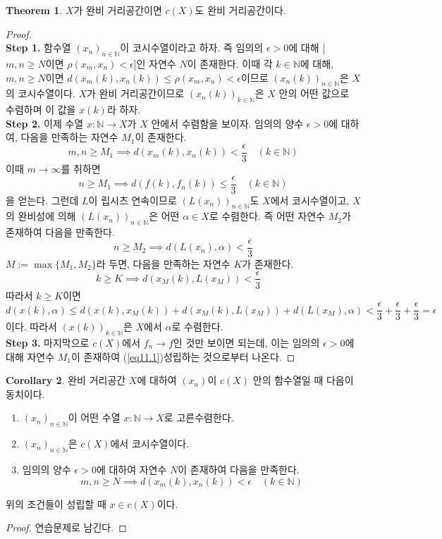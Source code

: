\documentclass[11pt]{book}
\numberwithin{equation}{chapter}
\def\NN{\mathbb{N}}
\def\eps{\epsilon}
\theoremstyle{definition}
\newtheorem{thm}{Theorem}[section]
\newtheorem{cor}[thm]{Corollary}
\newenvironment{enum}
	{\begin{enumerate}[label=(\alph*), leftmargin=2\parindent]}
	{\end{enumerate}}
\begin{document}
\begin{thm}
    \(X\)가 완비 거리공간이면 \(c(X)\)도 완비 거리공간이다.
\end{thm}
\begin{proof}
    \quad\\
    \textbf{Step 1.} 함수열 \((x_n)_{n \in \NN}\)이 코시수열이라고 하자. 즉 임의의 \(\eps > 0\)에 대해 [\(m, n \ge N\)이면 \(\rho(x_m, x_n) < \eps\)]인 자연수 \(N\)이 존재한다. 이때 각 \(k \in \NN\)에 대해, \(m, n \ge N\)이면 \(d(x_m(k), x_n(k)) \le \rho(x_m, x_n) < \eps\)이므로 \((x_n(k))_{n \in \NN}\)은 \(X\)의 코시수열이다. \(X\)가 완비 거리공간이므로 \((x_n(k))_{k \in \NN}\)은 \(X\) 안의 어떤 값으로 수렴하며 이 값을 \(x(k)\)라 하자.\\
    \textbf{Step 2.} 이제 수열 \(x : \NN \to X\)가 \(X\) 안에서 수렴함을 보이자. 임의의 양수 \(\eps > 0\)에 대하여, 다음을 만족하는 자연수 \(M_1\)이 존재한다.
    \[
        m, n \ge M_1 \implies d(x_m(k), x_n(k)) < \frac{\eps}{3} \quad (k \in \NN)
    \]
    이때 \(m \to \infty\)를 취하면
    \begin{equation} \label{eq11.1}
        n \ge M_1 \implies d(f(k), f_n(k)) \le \frac{\eps}{3} \quad (k \in \NN)
    \end{equation}
    을 얻는다. 그런데 \(L\)이 립시츠 연속이므로 \((L(x_n))_{n \in \NN}\)도 \(X\)에서 코시수열이고, \(X\)의 완비성에 의해 \((L(x_n))_{n \in \NN}\)은 어떤 \(\alpha \in X\)로 수렴한다. 즉 어떤 자연수 \(M_2\)가 존재하여 다음을 만족한다.
    \[
      n \ge M_2 \implies d(L(x_n), \alpha) < \frac{\eps}{3}  
    \]
    \(M := \max\{M_1, M_2\}\)라 두면, 다음을 만족하는 자연수 \(K\)가 존재한다.
    \[
    k \ge K \implies d(x_M(k), L(x_M)) < \frac{\eps}{3} \quad    
    \]
    따라서 \(k \ge K\)이면
    \[
    d(x(k), \alpha) \le d(x(k), x_M(k)) + d(x_M(k), L(x_M)) + d(L(x_M), \alpha) < \frac{\eps}{3} + \frac{\eps}{3} + \frac{\eps}{3} = \eps
    \]
    이다. 따라서 \((x(k))_{k \in \NN}\)은 \(X\)에서 \(\alpha\)로 수렴한다.\\
    \textbf{Step 3.} 마지막으로 \(c(X)\)에서 \(f_n \to f\)인 것만 보이면 되는데, 이는 임의의 \(\eps > 0\)에 대해 자연수 \(M_1\)이 존재하여 (\ref{eq11.1})\이 성립하는 것으로부터 나온다.
\end{proof}

\begin{cor}
    완비 거리공간 \(X\)에 대하여 \((x_n)\)이 \(c(X)\) 안의 함수열일 때 다음이 동치이다.
    \begin{enum}
        \item \((x_n)_{n \in \NN}\)이 어떤 수열 \(x : \NN \to X\)로 고른수렴한다.
        \item \((x_n)_{n \in \NN}\)은 \(c(X)\)에서 코시수열이다.
        \item 임의의 양수 \(\eps > 0\)에 대하여 자연수 \(N\)이 존재하여 다음을 만족한다.
        \[
        m, n \ge N \implies d(x_m(k), x_n(k)) < \eps \quad (k \in \NN)    
        \]
    \end{enum}
    위의 조건들이 성립할 때 \(x \in c(X)\)이다.
\end{cor}
\begin{proof}
    연습문제로 남긴다.
\end{proof}
\end{document}
